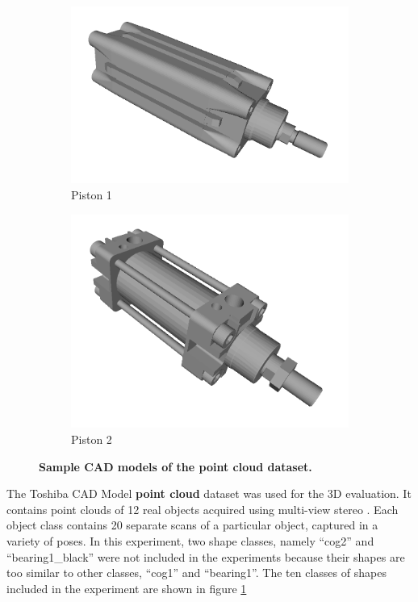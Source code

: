 \begin{figure}[t]
\begin{subfigure}[b]{0.19\linewidth}
		\includegraphics[width=1\linewidth]{./fig/eval/toshiba_piston1.png}
		\caption{Piston 1}
	\end{subfigure}
	\begin{subfigure}[b]{0.19\linewidth} \centering
		\includegraphics[width=1\linewidth]{./fig/eval/toshiba_piston2.png}
		\caption{Piston 2}
	\end{subfigure}
	\caption{\textbf{Sample CAD models of the \textbf{point cloud} dataset.}}
	\label{fig/reg/toshiba}
\end{figure}

The Toshiba CAD Model \textbf{point cloud} dataset \cite{Ltd.2011} was used for the 3D evaluation. It contains point clouds of 12 real objects acquired using multi-view stereo \cite{Vogiatzis2011}. Each object class contains 20 separate scans of a particular object, captured in a variety of poses. In this experiment, two shape classes, namely ``cog2'' and ``bearing1\_black'' were not included in the experiments because their shapes are too similar to other classes, \ie ``cog1'' and ``bearing1''. The ten classes of shapes included in the experiment are shown in figure \ref{fig/reg/toshiba} 

